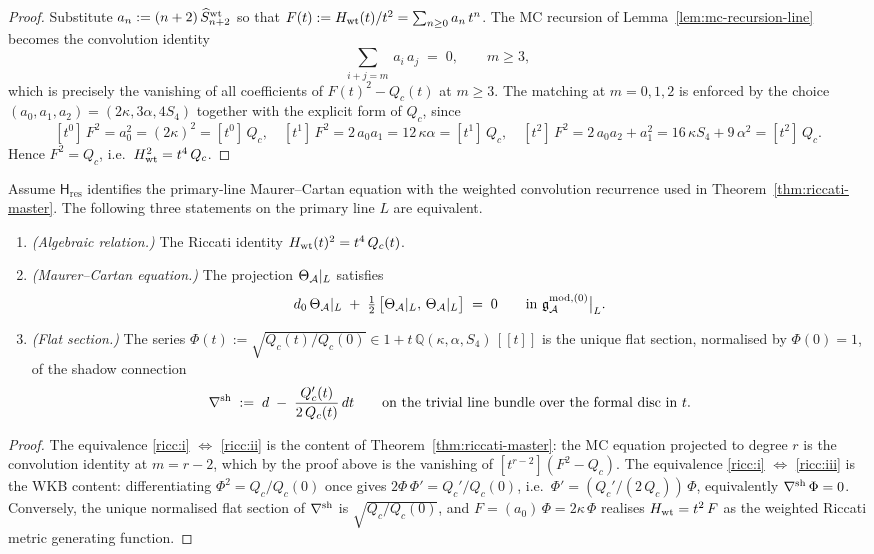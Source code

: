 \begin{proof}
Substitute $a_n := (n+2)\,\widehat S^{\rm wt}_{n+2}$ so that
$F(t) := H_{\rm wt}(t)/t^{2} = \sum_{n\ge 0} a_n\,t^{n}$. The MC recursion of
Lemma~\ref{lem:mc-recursion-line} becomes the convolution identity
\[
\sum_{i+j = m}\,a_i\,a_j \;=\; 0,
\qquad m \ge 3,
\]
which is precisely the vanishing of all coefficients of
$F(t)^{2} - Q_c(t)$ at $m \ge 3$. The matching at $m = 0, 1, 2$ is
enforced by the choice $(a_0, a_1, a_2) = (2\kappa, 3\alpha, 4 S_4)$
together with the explicit form of $Q_c$, since
\[
[t^{0}]\,F^{2} = a_0^{2} = (2\kappa)^{2} = [t^{0}]\,Q_c,
\quad
[t^{1}]\,F^{2} = 2\,a_0 a_1 = 12\,\kappa\alpha = [t^{1}]\,Q_c,
\quad
[t^{2}]\,F^{2} = 2\,a_0 a_2 + a_1^{2}
 = 16\,\kappa S_4 + 9\,\alpha^{2}
 = [t^{2}]\,Q_c.
\]
Hence $F^{2} = Q_c$, i.e.\ $H_{\rm wt}^{2} = t^{4}\,Q_c$.
\end{proof}

\begin{proposition}
\label{prop:riccati-three-presentations}
\ClaimStatusConditional
Assume $\mathsf H_{\mathrm{res}}$ identifies the primary-line
Maurer--Cartan equation with the weighted convolution recurrence used in
Theorem~\ref{thm:riccati-master}.
The following three statements on the primary line $L$ are
equivalent.
\begin{enumerate}[label=\textup{(\roman*)}]
\item\label{ricc:i} \emph{(Algebraic relation.)} The Riccati identity
$H_{\rm wt}(t)^{2} = t^{4}\,Q_c(t)$.
\item\label{ricc:ii} \emph{(Maurer--Cartan equation.)} The
projection $\Theta_{\mathcal{A}}|_L$ satisfies
\[
d_0\,\Theta_{\mathcal{A}}|_L \;+\; \tfrac{1}{2}\,
\bigl[\Theta_{\mathcal{A}}|_L,\,\Theta_{\mathcal{A}}|_L\bigr] \;=\; 0
\qquad
\text{in }
\mathfrak g^{\rm mod, (0)}_{\mathcal{A}}\big|_L.
\]
\item\label{ricc:iii} \emph{(Flat section.)} The series
$\Phi(t) := \sqrt{Q_c(t)/Q_c(0)} \in 1 + t\,\mathbb Q(\kappa,
\alpha, S_4)\,[\![t]\!]$ is the unique flat section, normalised by
$\Phi(0) = 1$, of the shadow connection
\[
\nabla^{\rm sh} \;:=\; d \;-\; \frac{Q_c'(t)}{2\,Q_c(t)}\,dt
\qquad
\text{on the trivial line bundle over the formal disc in $t$.}
\]
\end{enumerate}
\end{proposition}

\begin{proof}
The equivalence \ref{ricc:i} $\Leftrightarrow$ \ref{ricc:ii} is the
content of Theorem~\ref{thm:riccati-master}: the MC equation
projected to degree $r$ is the convolution identity at $m = r-2$,
which by the proof above is the vanishing of $[t^{r-2}](F^{2} - Q_c)$.
The equivalence \ref{ricc:i} $\Leftrightarrow$ \ref{ricc:iii} is the
WKB content: differentiating $\Phi^{2} = Q_c/Q_c(0)$ once gives
$2 \Phi\,\Phi' = Q_c'/Q_c(0)$, i.e.\
$\Phi' = (Q_c'/(2\,Q_c))\,\Phi$, equivalently
$\nabla^{\rm sh}\,\Phi = 0$. Conversely, the unique normalised flat
section of $\nabla^{\rm sh}$ is $\sqrt{Q_c/Q_c(0)}$, and
$F = (a_0)\,\Phi = 2\kappa\,\Phi$ realises
$H_{\rm wt} = t^{2}\,F$ as the weighted Riccati metric generating
function.
\end{proof}

